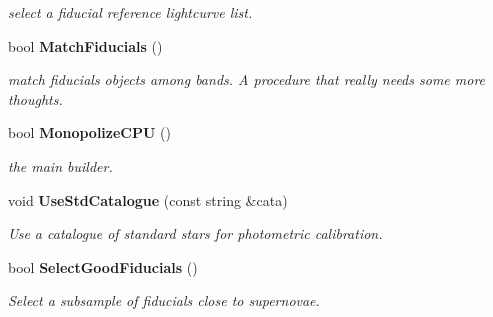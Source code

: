 \begin{CompactItemize}
\begin{CompactList}\small\item\em select a fiducial reference lightcurve list.\item\end{CompactList}\item 
{}
bool {\bf Match\-Fiducials} ()\label{class_lightcurveguru_a5}

\begin{CompactList}\small\item\em match fiducials objects among bands. A procedure that really needs some more thoughts.\item\end{CompactList}\item 
{}
bool {\bf Monopolize\-CPU} ()\label{class_lightcurveguru_a6}

\begin{CompactList}\small\item\em the main builder.\item\end{CompactList}\item 
{}
void {\bf Use\-Std\-Catalogue} (const string \&cata)\label{class_lightcurveguru_a7}

\begin{CompactList}\small\item\em Use a catalogue of standard stars for photometric calibration.\item\end{CompactList}\item 
{}
bool {\bf Select\-Good\-Fiducials} ()\label{class_lightcurveguru_a8}

\begin{CompactList}\small\item\em Select a subsample of fiducials close to supernovae.\item\end{CompactList}\end{CompactItemize}
